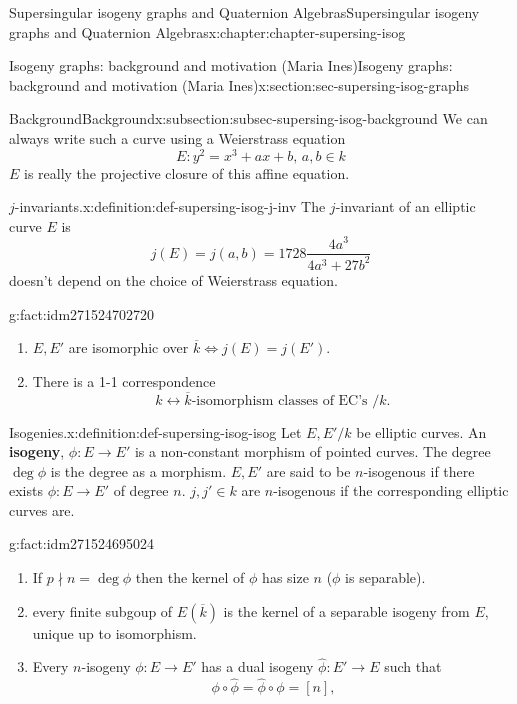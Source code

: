 \documentclass[oneside,10pt,]{book}
\newcommand{\terminology}[1]{\textbf{#1}}
\numberwithin{equation}{section}
\newcommand{\lb}{[}
\newcommand{\rb}{]}
\begin{document}
\begin{chapterptx}{Supersingular isogeny graphs and Quaternion Algebras}{}{Supersingular isogeny graphs and Quaternion Algebras}{}{}{x:chapter:chapter-supersing-isog}
\begin{sectionptx}{Isogeny graphs: background and motivation (Maria Ines)}{}{Isogeny graphs: background and motivation (Maria Ines)}{}{}{x:section:sec-supersing-isog-graphs}
\begin{subsectionptx}{Background}{}{Background}{}{}{x:subsection:subsec-supersing-isog-background}
We can always write such a curve using a Weierstrass equation%
\begin{equation*}
E\colon y^2=  x^3  + ax  +b,\,a,b    \in k
\end{equation*}
\(E\) is really the projective closure of this affine equation.%
\begin{definition}{\(j\)-invariants.}{x:definition:def-supersing-isog-j-inv}%
The \(j\)-invariant of an elliptic curve \(E\) is%
\begin{equation*}
j(E) = j(a,b) = 1728 \frac{4a^3}{4a^3 + 27b^2}
\end{equation*}
doesn't depend on the choice of Weierstrass equation.%
\end{definition}
\begin{fact}{}{}{g:fact:idm271524702720}%
%
\begin{enumerate}
\item{}\(E,E'\) are isomorphic over \(\overline k \iff j(E)  = j(E')\).%
\item{}There is a 1-1 correspondence%
\begin{equation*}
k \leftrightarrow \overline k \text{-isomorphism classes of EC's }/k\text{.}
\end{equation*}
%
\end{enumerate}
%
\end{fact}
\begin{definition}{Isogenies.}{x:definition:def-supersing-isog-isog}%
Let \(E,E'/k\) be elliptic curves. An \terminology{isogeny}, \(\phi \colon E\to E'\) is a non-constant morphism of pointed curves. The degree \(\deg \phi \) is the degree as a morphism. \(E,E'\) are said to be \(n\)-isogenous if there exists \(\phi\colon E\to E'\) of degree \(n\). \(j,j'\in k\) are \(n\)-isogenous if the corresponding elliptic curves are.%
\end{definition}
\begin{fact}{}{}{g:fact:idm271524695024}%
%
\begin{enumerate}
\item{}If \(p \nmid n = \deg \phi\) then the kernel of \(\phi\) has size \(n\) (\(\phi\) is separable).%
\item{}every finite subgoup of \(E(\overline k )\) is the kernel of a separable isogeny from \(E\), unique up to isomorphism.%
\item{}Every \(n\)-isogeny \(\phi\colon E \to E'\) has  a dual isogeny \(\hat \phi \colon E' \to E\) such that%
\begin{equation*}
\phi\circ \hat\phi = \hat\phi \circ \phi = \lb n \rb\text{,}

\end{equation*}
\end{enumerate}
\end{fact}
\end{subsectionptx}
\end{sectionptx}
\end{chapterptx}
\end{document}
